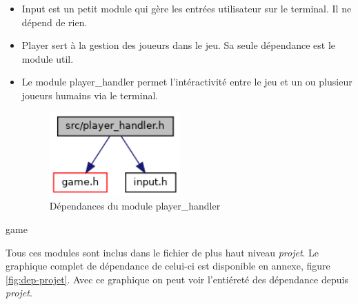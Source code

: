 \begin{itemize}
    \item Input est un petit module qui gère les entrées utilisateur sur le terminal. Il ne dépend de rien.

    \item Player sert à la gestion des joueurs dans le jeu. Sa seule dépendance est le module util.

    \item Le module player\_handler permet l'intéractivité entre le jeu et un ou plusieur joueurs humains via le terminal.
    \begin{figure}[H]
        \centering \includegraphics[width=5cm]{images/player__handler_8h__incl.png}
        \caption{Dépendances du module player\_handler}
        \label{fig:dep-playerhandler}
    \end{figure}


\end{itemize}





game


Tous ces modules sont inclus dans le fichier de plus haut niveau \emph{projet}. Le graphique complet de dépendance
de celui-ci est disponible en annexe, figure \ref{fig:dep-projet}. Avec ce graphique on peut voir l'entiéreté des dépendance depuis \emph{projet}. 






